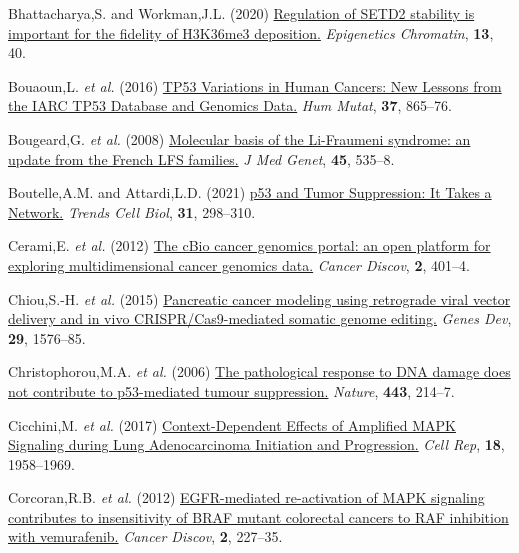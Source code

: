 \begin{CSLReferences}{1}{0}
\leavevmode{}%
Bhattacharya,S. and Workman,J.L. (2020) \href{https://doi.org/10.1186/s13072-020-00362-8}{Regulation of SETD2 stability is important for the fidelity of H3K36me3 deposition.} \emph{Epigenetics Chromatin}, \textbf{13}, 40.

\leavevmode{}%
Bouaoun,L. \emph{et al.} (2016) \href{https://doi.org/10.1002/humu.23035}{TP53 Variations in Human Cancers: New Lessons from the IARC TP53 Database and Genomics Data.} \emph{Hum Mutat}, \textbf{37}, 865--76.

\leavevmode{}%
Bougeard,G. \emph{et al.} (2008) \href{https://doi.org/10.1136/jmg.2008.057570}{Molecular basis of the Li-Fraumeni syndrome: an update from the French LFS families.} \emph{J Med Genet}, \textbf{45}, 535--8.

\leavevmode{}%
Boutelle,A.M. and Attardi,L.D. (2021) \href{https://doi.org/10.1016/j.tcb.2020.12.011}{p53 and Tumor Suppression: It Takes a Network.} \emph{Trends Cell Biol}, \textbf{31}, 298--310.

\leavevmode{}%
Cerami,E. \emph{et al.} (2012) \href{https://doi.org/10.1158/2159-8290.cd-12-0095}{The cBio cancer genomics portal: an open platform for exploring multidimensional cancer genomics data.} \emph{Cancer Discov}, \textbf{2}, 401--4.

\leavevmode{}%
Chiou,S.-H. \emph{et al.} (2015) \href{https://doi.org/10.1101/gad.264861.115}{Pancreatic cancer modeling using retrograde viral vector delivery and in vivo CRISPR/Cas9-mediated somatic genome editing.} \emph{Genes Dev}, \textbf{29}, 1576--85.

\leavevmode{}%
Christophorou,M.A. \emph{et al.} (2006) \href{https://doi.org/10.1038/nature05077}{The pathological response to DNA damage does not contribute to p53-mediated tumour suppression.} \emph{Nature}, \textbf{443}, 214--7.

\leavevmode{}%
Cicchini,M. \emph{et al.} (2017) \href{https://doi.org/10.1016/j.celrep.2017.01.069}{Context-Dependent Effects of Amplified MAPK Signaling during Lung Adenocarcinoma Initiation and Progression.} \emph{Cell Rep}, \textbf{18}, 1958--1969.

\leavevmode{}%
Corcoran,R.B. \emph{et al.} (2012) \href{https://doi.org/10.1158/2159-8290.cd-11-0341}{EGFR-mediated re-activation of MAPK signaling contributes to insensitivity of BRAF mutant colorectal cancers to RAF inhibition with vemurafenib.} \emph{Cancer Discov}, \textbf{2}, 227--35.


\end{CSLReferences}
